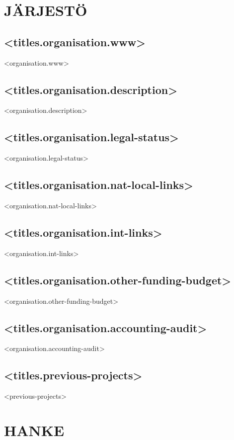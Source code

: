 \documentclass[twoside,a4paper]{article}
\begin{document}
	\restoregeometry
	
	\newpage
	\section{JÄRJESTÖ}
		\subsection*{<titles.organisation.www>}
		    <organisation.www>
		
		\subsection*{<titles.organisation.description>}
		    <organisation.description>
		
		\subsection*{<titles.organisation.legal-status>}
		    <organisation.legal-status>
		
		\subsection*{<titles.organisation.nat-local-links>}
		    <organisation.nat-local-links>
		
		\subsection*{<titles.organisation.int-links>}
		    <organisation.int-links>
		
		\subsection*{<titles.organisation.other-funding-budget>}
		    <organisation.other-funding-budget>
		
		\subsection*{<titles.organisation.accounting-audit>}
		    <organisation.accounting-audit>
		
		\subsection*{<titles.previous-projects>}
		    <previous-projects>
		
		\newpage		
		\section{HANKE}
\end{document}
